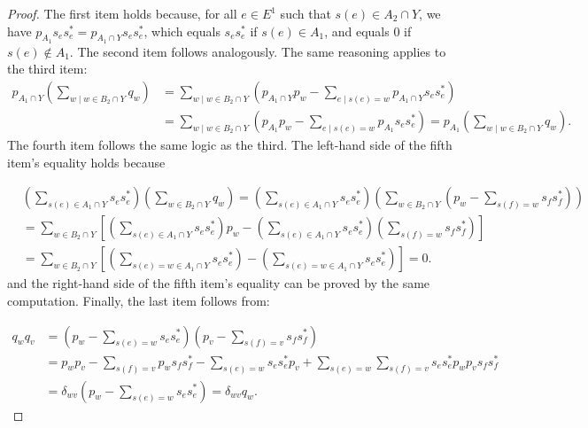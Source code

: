 \documentclass[12pt, reqno]{amsart}
\theoremstyle{definition}
\theoremstyle{remark}
\numberwithin{equation}{section}
\begin{document}
\begin{proof}
  
The first item holds because, for all \(e \in E^1\) such that \(s(e) \in A_2 \cap Y\), we have  $
p_{A_1} s_e s_e^* = p_{A_1 \cap Y} s_e s_e^*$, which equals $ s_e s_e^*$ if $s(e) \in A_1$, and equals 0 if $s(e) \notin A_1$.
The second item follows analogously. The same reasoning applies to the third item:  
\begin{align*}
   p_{A_1 \cap Y} \left( \sum\limits_{w \mid w \in B_2 \cap Y } q_w\right) & =  \sum\limits_{w \mid w \in B_2 \cap Y } 
 \left( p_{A_1 \cap Y} p_w - \sum\limits_{e \mid s(e) = w} p_{A_1 \cap Y} s_e s_e^* \right)  \\
 & = \sum\limits_{w \mid w \in B_2 \cap Y } 
 \left( p_{A_1} p_w - \sum\limits_{e \mid s(e) = w} p_{A_1} s_e s_e^* \right) = p_{A_1} \left( \sum\limits_{w \mid w \in B_2 \cap Y } q_w\right). 
\end{align*}  
The fourth item follows the same logic as the third. The left-hand side of the fifth item’s equality holds because 


\begin{align*}
   & \left( \sum_{s(e) \in A_1 \cap Y} s_e s_e^* \right) 
   \left( \sum_{w \in B_2 \cap Y} q_w \right) = 
   \left( \sum_{s(e) \in A_1 \cap Y} s_e s_e^* \right) 
   \left( \sum_{w \in B_2 \cap Y} \left( p_w - \sum_{s(f) = w} s_f s_f^* \right) \right) \\
    & = \sum_{w \in B_2 \cap Y} \left[ 
    \left( \sum_{s(e) \in A_1 \cap Y} s_e s_e^* \right) p_w - 
    \left( \sum_{s(e) \in A_1 \cap Y} s_e s_e^* \right) 
    \left( \sum_{s(f) = w} s_f s_f^* \right) \right] \\
    & = \sum_{w \in B_2 \cap Y} \left[ 
    \left( \sum_{s(e) = w \in A_1 \cap Y} s_e s_e^* \right) - 
    \left( \sum_{s(e) = w \in A_1 \cap Y} s_e s_e^* \right) 
    \right] = 0.
\end{align*}
and the right-hand side of the fifth item’s  equality can be proved by the same computation.  Finally, the last item follows from:


\begin{align*}
    q_w q_v & = \left(p_w - \sum_{s(e) = w} s_e s_e^* \right) 
    \left(p_v - \sum_{s(f) = v} s_f s_f^* \right) \\
    & = p_w p_v - \sum_{s(f) = v} p_w s_f s_f^* - 
    \sum_{s(e) = w} s_e s_e^* p_v + 
    \sum_{s(e) = w} \sum_{s(f) = v} s_e s_e^* p_w p_v s_f s_f^* \\
    & = \delta_{wv} \left(p_w - \sum_{s(e) = w} s_e s_e^* \right) = \delta_{wv}q_w.
\end{align*}


\end{proof}
\end{document}

